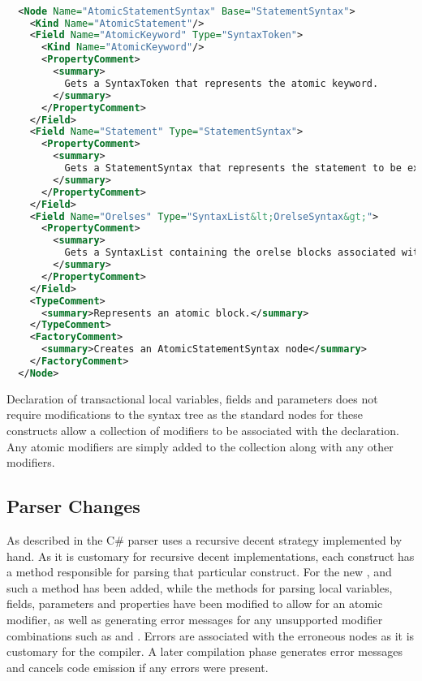 \begin{lstlisting}[label=lst:roslyn_extension_tre_xml,
  caption={AtomicStatement \ac{XML} definition},
  language=XML,  
  showspaces=false,
  showtabs=false,
  breaklines=true,
  showstringspaces=false,
  breakatwhitespace=true,
  escapechar=~,
  morekeywords={Name, Base, Type}]  % Start your code-block

  <Node Name="AtomicStatementSyntax" Base="StatementSyntax">
    <Kind Name="AtomicStatement"/>
    <Field Name="AtomicKeyword" Type="SyntaxToken">
      <Kind Name="AtomicKeyword"/>
      <PropertyComment>
        <summary>
          Gets a SyntaxToken that represents the atomic keyword.
        </summary>
      </PropertyComment>
    </Field>
    <Field Name="Statement" Type="StatementSyntax">
      <PropertyComment>
        <summary>
          Gets a StatementSyntax that represents the statement to be executed when the condition is true.
        </summary>
      </PropertyComment>
    </Field>
    <Field Name="Orelses" Type="SyntaxList&lt;OrelseSyntax&gt;">
      <PropertyComment>
        <summary>
          Gets a SyntaxList containing the orelse blocks associated with the atomic statement.
        </summary>
      </PropertyComment>
    </Field>
    <TypeComment>
      <summary>Represents an atomic block.</summary>
    </TypeComment>
    <FactoryComment>
      <summary>Creates an AtomicStatementSyntax node</summary>
    </FactoryComment>
  </Node>
\end{lstlisting}

Declaration of transactional local variables, fields and parameters does not require modifications to the syntax tree as the standard nodes for these constructs allow a collection of modifiers to be associated with the declaration. Any atomic modifiers are simply added to the collection along with any other modifiers. 


\subsection{Parser Changes}
As described in  the C\# parser uses a recursive decent strategy implemented by hand. As it is customary for recursive decent implementations, each construct has a method responsible for parsing that particular construct. For the new ,  and  such a method has been added, while the methods for parsing local variables, fields, parameters and properties have been modified to allow for an atomic modifier, as well as generating error messages for any unsupported modifier combinations such as  and . Errors are associated with the erroneous nodes as it is customary for the compiler. A later compilation phase generates error messages and cancels code emission if any errors were present.

